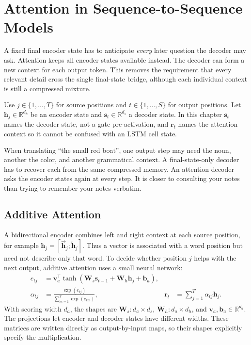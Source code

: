 \documentclass[11pt, oneside]{book}
\newcommand{\R}{\mathbb{R}}
\newcommand{\T}{^{\mathsf{T}}}           %
\let\originalsection\section
\renewcommand{\section}{\Needspace{7\baselineskip}\originalsection}
\let\originalsubsection\subsection
\renewcommand{\subsection}{\Needspace{6\baselineskip}\originalsubsection}
\begin{document}
\section{Attention in Sequence-to-Sequence Models}\label{sec:source-4-2}
A fixed final encoder state has to anticipate \emph{every} later question the decoder may ask. Attention keeps all encoder states available instead. The decoder can form a new context for each output token. This removes the requirement that every relevant detail cross the single final-state bridge, although each individual context is still a compressed mixture.

Use $j\in\{1,\ldots,T\}$ for source positions and $t\in\{1,\ldots,S\}$ for output positions. Let $\mathbf{h}_j\in\R^{d_h}$ be an encoder state and $\mathbf{s}_t\in\R^{d_s}$ a decoder state. In this chapter $\mathbf{s}_t$ names the decoder state, not a gate pre-activation, and $\mathbf{r}_t$ names the attention context so it cannot be confused with an LSTM cell state.

\begin{intbox}[title={A different question at every output step}]
When translating ``the small red boat'', one output step may need the noun, another the color, and another grammatical context. A final-state-only decoder has to recover each from the same compressed memory. An attention decoder asks the encoder states again at every step. It is closer to consulting your notes than trying to remember your notes verbatim.
\end{intbox}

\subsection{Additive Attention}\label{sec:source-4-2-1}
A bidirectional encoder combines left and right context at each source position, for example $\mathbf{h}_j=[\overrightarrow{\mathbf{h}}_j;\overleftarrow{\mathbf{h}}_j]$. Thus a vector is associated with a word position but need not describe only that word. To decide whether position $j$ helps with the next output, additive attention uses a small neural network:
\begin{align}
 e_{tj}&=\mathbf{v}_a\T\tanh(\mathbf{W}_s\mathbf{s}_{t-1}
                          +\mathbf{W}_h\mathbf{h}_j+\mathbf{b}_a),\label{eq:additive-score}\\
 \alpha_{tj}&=\frac{\exp(e_{tj})}{\sum_{m=1}^{T}\exp(e_{tm})},&
 \mathbf{r}_t&=\sum_{j=1}^{T}\alpha_{tj}\mathbf{h}_j.
\end{align}
With scoring width $d_a$, the shapes are $\mathbf{W}_s:d_a\times d_s$, $\mathbf{W}_h:d_a\times d_h$, and $\mathbf{v}_a,\mathbf{b}_a\in\R^{d_a}$. The projections let encoder and decoder states have different widths. These matrices are written directly as output-by-input maps, so their shapes explicitly specify the multiplication.
\end{document}
